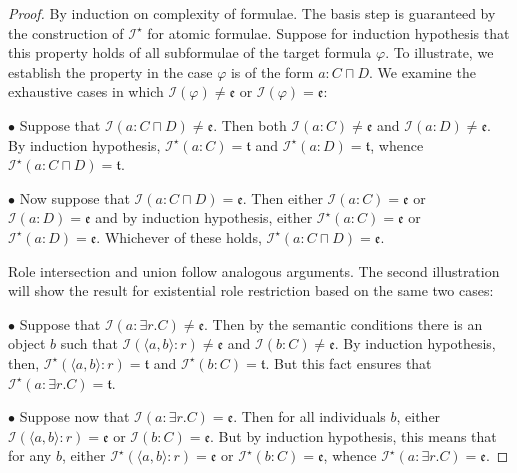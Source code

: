 \documentclass[letterpaper]{article} %
\theoremstyle{definition}
\theoremstyle{definition}
\theoremstyle{definition}
\theoremstyle{definition}
\theoremstyle{definition}
\begin{document}
\begin{proof}
    By induction on complexity of formulae. The basis step is guaranteed by the construction of $\mathcal{I}^{\star}$ for atomic formulae. Suppose for induction hypothesis that this property holds of all subformulae of the target formula $\varphi$. To illustrate, we establish the property in the case $\varphi$ is of the form $a:C\sqcap D$. We examine the exhaustive cases in which $\mathcal{I}(\varphi)\neq\mathfrak{e}$ or $\mathcal{I}(\varphi)=\mathfrak{e}$:

    \vspace{.2cm}
    
    \noindent$\bullet$ Suppose that $\mathcal{I}(a:C\sqcap D)\neq \mathfrak{e}$. Then both $\mathcal{I}(a:C)\neq \mathfrak{e}$ and $\mathcal{I}(a:D)\neq \mathfrak{e}$. By induction hypothesis, $\mathcal{I}^{\star}(a:C)=\mathfrak{t}$ and $\mathcal{I}^{\star}(a:D)=\mathfrak{t}$, whence $\mathcal{I}^{\star}(a:C\sqcap D)=\mathfrak{t}$.

    

    \vspace{.2cm}
    
    \noindent$\bullet$ Now suppose that $\mathcal{I}(a:C\sqcap D)= \mathfrak{e}$. Then either $\mathcal{I}(a:C)=\mathfrak{e}$ or $\mathcal{I}(a:D)=\mathfrak{e}$ and by induction hypothesis, either $\mathcal{I}^{\star}(a:C)=\mathfrak{e}$ or $\mathcal{I}^{\star}(a:D)=\mathfrak{e}$. Whichever of these holds, $\mathcal{I}^{\star}(a:C\sqcap D)=\mathfrak{e}$.

    \vspace{.2cm}
    
    \noindent Role intersection and union follow analogous arguments. The second illustration will show the result for existential role restriction based on the same two cases:

     \vspace{.2cm}
    
    \noindent$\bullet$ Suppose that $\mathcal{I}(a:\exists r.C)\neq\mathfrak{e}$. Then by the semantic conditions there is an object $b$ such that $\mathcal{I}(\langle a,b\rangle: r)\neq\mathfrak{e}$ and $\mathcal{I}(b:C)\neq\mathfrak{e}$. By induction hypothesis, then, $\mathcal{I}^{\star}(\langle a,b\rangle: r)=\mathfrak{t}$ and $\mathcal{I}^{\star}(b:C)=\mathfrak{t}$. But this fact ensures that $\mathcal{I}^{\star}(a:\exists r.C)=\mathfrak{t}$.

     \vspace{.2cm}
    
    \noindent$\bullet$ Suppose now that $\mathcal{I}(a:\exists r.C)=\mathfrak{e}$. Then for all individuals $b$, either $\mathcal{I}(\langle a,b\rangle:r)=\mathfrak{e}$ or $\mathcal{I}(b:C)=\mathfrak{e}$. But by induction hypothesis, this means that for any $b$, either $\mathcal{I}^{\star}(\langle a,b\rangle:r)=\mathfrak{e}$ or $\mathcal{I}^{\star}(b:C)=\mathfrak{e}$, whence $\mathcal{I}^{\star}(a:\exists r.C)=\mathfrak{e}$.
    
    
\end{proof}
\end{document}
